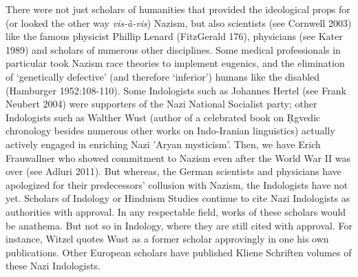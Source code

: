 There were not just scholars of humanities that provided the ideological props for (or looked the other way \textit{vis-à-vis}) Nazism, but also scientists (see Cornwell 2003) like the famous physicist Phillip Lenard (FitzGerald 176), physicians (see Kater 1989) and scholars of numerous other disciplines. Some medical professionals in particular took Nazism race theories to implement eugenics, and the elimination of ‘genetically defective’ (and therefore ‘inferior’) humans like the disabled (Hamburger 1952:108-110). Some Indologists such as Johannes Hertel (see Frank Neubert 2004) were supporters of the Nazi National Socialist party; other Indologists such as Walther Wust (author of a celebrated book on Ṛgvedic chronology besides numerous other works on Indo-Iranian linguistics) actually actively engaged in enriching Nazi 'Aryan mysticism'. Then, we have Erich Frauwallner who showed commitment to Nazism even after the World War II was over (see Adluri 2011). But whereas, the German scientists and physicians have apologized for their predecessors’ collusion with Nazism, the Indologists have not yet. Scholars of Indology or Hinduism Studies continue to cite Nazi Indologists as authorities with approval. In any respectable field, works of these scholars would be anathema. But not so in Indology, where they are still cited with approval. For instance, Witzel quotes Wust as a former scholar approvingly in one his own publications. Other European scholars have published Kliene Schriften volumes of these Nazi Indologists.

